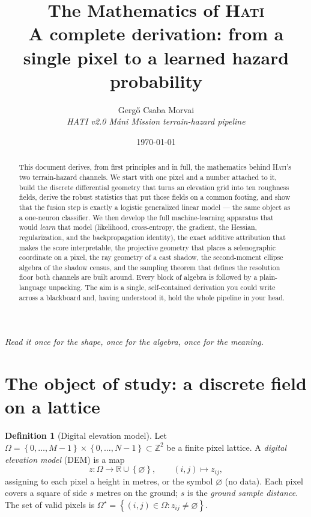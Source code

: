 \documentclass[11pt]{article}
\title{\sffamily\bfseries\color{hb}\Large The Mathematics of \textsc{Hati}\\[2pt]
\large A complete derivation: from a single pixel to a learned hazard probability}
\author{\normalsize Gerg\H{o} Csaba Morvai \\[2pt]
\footnotesize\itshape HATI v2.0 \textendash{} M\'ani Mission terrain-hazard pipeline}
\date{\footnotesize\today}
\theoremstyle{definition}
\newtheorem{definition}{Definition}[section]
\newcommand{\R}{\mathbb{R}}
\newcommand{\Z}{\mathbb{Z}}
\newcommand{\set}[1]{\left\{ #1 \right\}}
\begin{document}
\maketitle

\begin{abstract}\noindent
This document derives, from first principles and in full, the mathematics behind
\textsc{Hati}'s two terrain-hazard channels. We start with one pixel and a number
attached to it, build the discrete differential geometry that turns an elevation
grid into ten roughness fields, derive the robust statistics that put those fields
on a common footing, and show that the fusion step is exactly a logistic
generalized linear model --- the same object as a one-neuron classifier. We then
develop the full machine-learning apparatus that would \emph{learn} that model
(likelihood, cross-entropy, the gradient, the Hessian, regularization, and the
backpropagation identity), the exact additive attribution that makes the score
interpretable, the projective geometry that places a selenographic coordinate on a
pixel, the ray geometry of a cast shadow, the second-moment ellipse algebra of the
shadow census, and the sampling theorem that defines the resolution floor both
channels are built around. Every block of algebra is followed by a plain-language
unpacking. The aim is a single, self-contained derivation you could write across a
blackboard and, having understood it, hold the whole pipeline in your head.
\end{abstract}

\begin{center}\small\itshape
Read it once for the shape, once for the algebra, once for the meaning.
\end{center}

\tableofcontents
\bigskip

\section{The object of study: a discrete field on a lattice}

\begin{definition}[Digital elevation model]
Let $\Omega = \set{0,\dots,M-1}\times\set{0,\dots,N-1}\subset\Z^2$ be a finite
pixel lattice. A \emph{digital elevation model} (DEM) is a map
\[
z:\Omega\longrightarrow \R\cup\set{\varnothing},\qquad (i,j)\mapsto z_{ij},
\]
assigning to each pixel a height in metres, or the symbol $\varnothing$ (no data).
Each pixel covers a square of side $s$ metres on the ground; $s$ is the
\emph{ground sample distance}. The set of valid pixels is
$\Omega^\star=\set{(i,j)\in\Omega: z_{ij}\neq\varnothing}$.
\end{definition}
\end{document}
